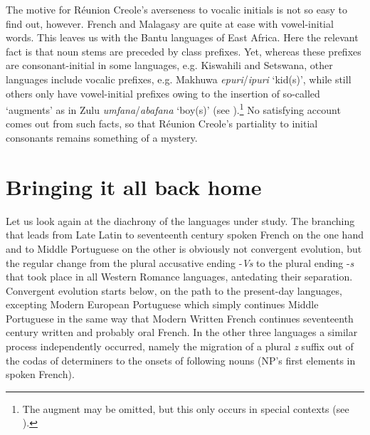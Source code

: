 \documentclass[output=paper]{langscibook}
\begin{document}
The motive for Réunion Creole’s averseness to vocalic initials is not so easy to find out, however. French and Malagasy are quite at ease with vowel-initial words. This leaves us with the Bantu languages of East Africa. Here the relevant fact is that noun stems are preceded by class prefixes. Yet, whereas these prefixes are con\-so\-nant-ini\-tial in some languages, e.g. Kiswahili and Setswana, other languages include vocalic prefixes, e.g. Makhuwa \textit{epuri}\slash\textit{ipuri} ‘kid(s)’, while still others only have vowel-initial prefixes owing to the insertion of so-called ‘augments’ as in Zulu \textit{umfana}\slash\textit{abafana} ‘boy(s)’ (see \citealt{NursePhilippson2006}).\footnote{The augment may be omitted, but this only occurs in special contexts (see \citealt{Mbeje2005}).} No satisfying account comes out from such facts, so that Réunion Creole’s partiality to initial consonants remains something of a mystery.

\section{Bringing it all back home}\label{sec:kihm:6}

Let us look again at the diachrony of the languages under study. The branching that leads from Late Latin to seventeenth century spoken French on the one hand and to Middle Portuguese on the other is obviously not convergent evolution, but the regular change from the plural accusative ending -\textit{Vs} to the plural ending -\textit{s} that took place in all Western Romance languages, antedating their separation. Convergent evolution starts below, on the path to the present-day languages, excepting Modern European Portuguese which simply continues Middle Portuguese in the same way that Modern Written French continues seventeenth century written and probably oral French. In the other three languages a similar process independently occurred, namely the migration of a plural \textit{z} suffix out of the codas of determiners to the onsets of following nouns (NP’s first elements in spoken French).
\end{document}

